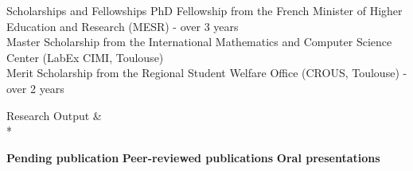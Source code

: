 \documentclass[a4paper,12pt]{article}
\begin{document}
\begin{sect}{Scholarships and Fellowships}
     {PhD Fellowship from the French Minister of Higher Education and Research (MESR) - over 3 years}
 \\
 
     {Master Scholarship from the International Mathematics and Computer Science Center (LabEx CIMI, Toulouse)}
 \\
     
     {Merit Scholarship from the Regional Student Welfare Office (CROUS, Toulouse) - over 2 years}
\end{sect}

\newpage
\begin{sect}[]{Research Output}
  &  \\*
\end{sect}%
\vspace{-\baselineskip}
\nocite{*}%
\textbf{Pending publication}
\printbibliography[heading=none, type=unpublished]
\textbf{Peer-reviewed publications}
\printbibliography[heading=none, nottype=misc,nottype=unpublished]
\textbf{Oral presentations}
\printbibliography[heading=none, nottype=unpublished, subtype=talk]
\end{document}
